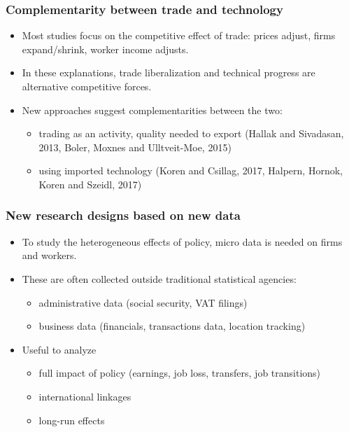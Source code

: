 \documentclass[aspectratio=169,compress,mathserif]{beamer}
\begin{document}
\begin{frame}\frametitle{Complementarity between trade and technology}\hypertarget{Complementarity between trade and technology}{}
\begin{itemize}
\item Most studies focus on the competitive effect of trade: prices adjust, firms expand/shrink, worker income adjusts.

\item In these explanations, trade liberalization and technical progress are alternative competitive forces. 

\item New approaches suggest complementarities between the two:
\begin{itemize}
\item trading as an activity, quality needed to export (Hallak and Sivadasan, 2013, Boler, Moxnes and Ulltveit-Moe, 2015)

\item using imported technology (Koren and Csillag, 2017, Halpern, Hornok, Koren and Szeidl, 2017)


\end{itemize}

\end{itemize}
\end{frame}



\begin{frame}\frametitle{New research designs based on new data}\hypertarget{New research designs based on new data}{}
\begin{itemize}
\item To study the heterogeneous effects of policy, micro data is needed on firms and workers.

\item These are often collected outside traditional statistical agencies:
\begin{itemize}
\item administrative data (social security, VAT filings)

\item business data (financials, transactions data, location tracking)
\end{itemize}

\item Useful to analyze
\begin{itemize}
\item full impact of policy (earnings, job loss, transfers, job transitions)

\item international linkages

\item long-run effects


\end{itemize}

\end{itemize}
\end{frame}
\end{document}
